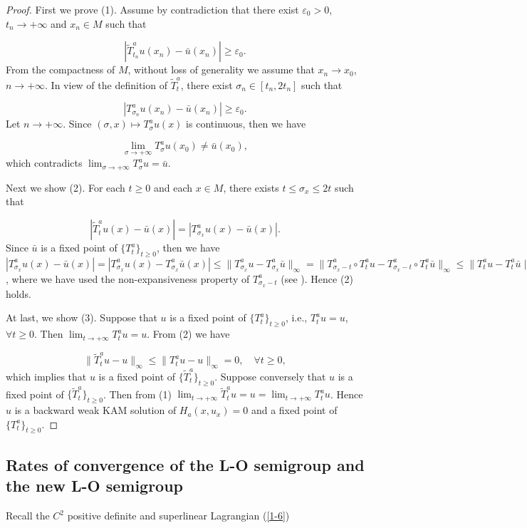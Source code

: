 \documentclass{amsart}[12pt]
\theoremstyle{definition}
\theoremstyle{remark}
\numberwithin{equation}{section}
\begin{document}
\begin{proof}
First we prove (1). Assume by contradiction that there exist
$\varepsilon_0>0$, $t_n\rightarrow+\infty$ and $x_n\in M$ such
that

\[
|\tilde{T}^a_{t_n}u(x_n)-\bar{u}(x_n)|\geq\varepsilon_0.
\]
From the compactness of $M$, without loss of generality we assume
that $x_n\rightarrow x_0$, $n\rightarrow+\infty$. In view of the
definition of $\tilde{T}^a_t$, there exist $\sigma_n\in[t_n,2t_n]$ such
that

\[
|T^a_{\sigma_n}u(x_n)-\bar{u}(x_n)|\geq\varepsilon_0.
\]
Let $n\rightarrow+\infty$. Since $(\sigma,x)\mapsto T^a_\sigma u(x)$ is
continuous, then we have

\[
\lim_{\sigma\rightarrow+\infty}T^a_\sigma u(x_0)\neq\bar{u}(x_0),
\]
which contradicts $\lim_{\sigma\rightarrow+\infty}T^a_\sigma u=\bar{u}$.

Next we show (2). For each $t\geq 0$ and each $x\in M$, there
exists $t\leq \sigma_x\leq 2t$ such that

\[
|\tilde{T}^a_tu(x)-\bar{u}(x)|=|T^a_{\sigma_x}u(x)-\bar{u}(x)|.
\]
Since $\bar{u}$ is a fixed point of $\{T^a_t\}_{t\geq 0}$, then we
have
$|T^a_{\sigma_x}u(x)-\bar{u}(x)|=|T^a_{\sigma_x}u(x)-T^a_{\sigma_x}\bar{u}(x)|\leq
\|T^a_{\sigma_x}u-T^a_{\sigma_x}\bar{u}\|_\infty=\|T^a_{\sigma_x-t}\circ
T^a_tu-T^a_{\sigma_x-t}\circ T^a_t\bar{u}\|_\infty\leq
\|T^a_tu-T^a_t\bar{u}\|_\infty=\|T^a_tu-\bar{u}\|_\infty$, where
we have used the non-expansiveness property of $T^a_{\sigma_x-t}$
(see \cite[Corollary 4.4.4]{Fat-b}). Hence (2) holds.

At last, we show (3). Suppose that $u$ is a fixed point of
$\{T^a_t\}_{t\geq 0}$, i.e., $T^a_tu=u$, $\forall t\geq 0$. Then
$\lim_{t\rightarrow+\infty}T^a_tu=u$. From (2) we have

\[
\|\tilde{T}^a_tu-u\|_\infty\leq\|T^a_tu-u\|_\infty=0, \quad
\forall t\geq 0,
\]
which implies that $u$ is a fixed point of
$\{\tilde{T}^a_t\}_{t\geq 0}$. Suppose conversely that $u$ is a
fixed point of $\{\tilde{T}^a_t\}_{t\geq 0}$. Then from (1)
$\lim_{t\rightarrow+\infty}\tilde{T}^a_tu=u=\lim_{t\rightarrow+\infty}T^a_tu$.
Hence $u$ is a backward weak KAM solution of $H_a(x,u_x)=0$ and a
fixed point of $\{T^a_t\}_{t\geq 0}$.
\end{proof}

\subsection{Rates of convergence of the L-O semigroup and the new L-O
semigroup} Recall the $C^2$ positive definite and superlinear
Lagrangian (\ref{1-6})
\end{document}
